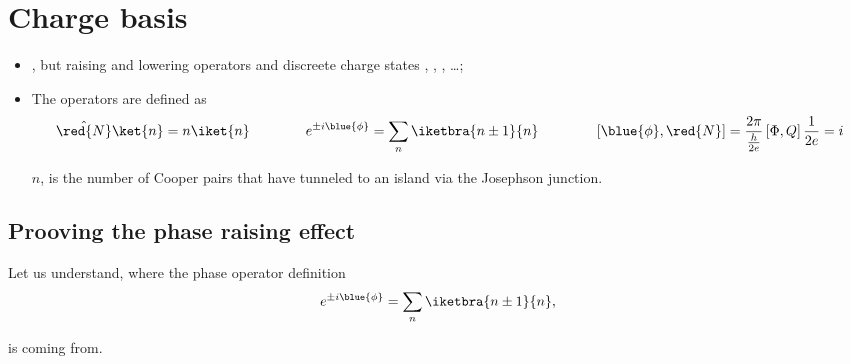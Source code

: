 \section{Charge basis\label{sec:charge_basis}}

\begin{itemize}
\item {}, but raising and lowering
  operators and  discreete charge states ,  , ,
   \ldots;
\item The operators are defined as
  \begin{equation}\label{key}
    \hat{\red{N}}\ket{n} = n\iket{n}\qquad\qquad e^{\pm i\blue{\phi}} = \sum_n\iketbra{n\pm 1}{n} \qquad\qquad \left[\blue{\phi},\red{N}\right] = \frac{2\pi}{\frac{h}{2e}}\left[\Phi,Q\right]\frac{1}{2e} = i
  \end{equation}

  \noindent $ n $, is the number  of Cooper pairs that have tunneled to
  an island via the Josephson junction.
\end{itemize}

\subsection{Prooving the phase raising effect}
Let us understand, where the phase operator definition
\begin{equation}\label{key}
  e^{\pm i\blue{\phi}} = \sum_n\iketbra{n\pm 1}{n},
\end{equation}

\noindent is coming from.

